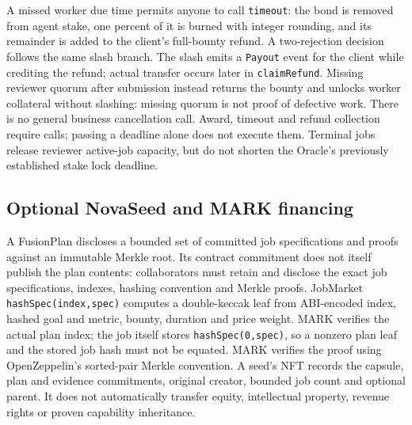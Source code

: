 \documentclass[11pt,letterpaper]{article}
\begin{document}
A missed worker due time permits anyone to call \texttt{timeout}: the bond is removed from agent stake, one percent of it is burned with integer rounding, and its remainder is added to the client's full-bounty refund. A two-rejection decision follows the same slash branch. The slash emits a \texttt{Payout} event for the client while crediting the refund; actual transfer occurs later in \texttt{claimRefund}. Missing reviewer quorum after submission instead returns the bounty and unlocks worker collateral without slashing: missing quorum is not proof of defective work. There is no general business cancellation call. Award, timeout and refund collection require calls; passing a deadline alone does not execute them. Terminal jobs release reviewer active-job capacity, but do not shorten the Oracle's previously established stake lock deadline.

\subsection{Optional NovaSeed and MARK financing}
A FusionPlan discloses a bounded set of committed job specifications and proofs against an immutable Merkle root. Its contract commitment does not itself publish the plan contents: collaborators must retain and disclose the exact job specifications, indexes, hashing convention and Merkle proofs. JobMarket \texttt{hashSpec(\allowbreak{}index,\allowbreak{}spec)} computes a double-keccak leaf from ABI-encoded index, hashed goal and metric, bounty, duration and price weight. MARK verifies the actual plan index; the job itself stores \texttt{hashSpec(\allowbreak{}0,\allowbreak{}spec)}, so a nonzero plan leaf and the stored job hash must not be equated. MARK verifies the proof using OpenZeppelin's sorted-pair Merkle convention. A seed's NFT records the capsule, plan and evidence commitments, original creator, bounded job count and optional parent. It does not automatically transfer equity, intellectual property, revenue rights or proven capability inheritance.
\end{document}
